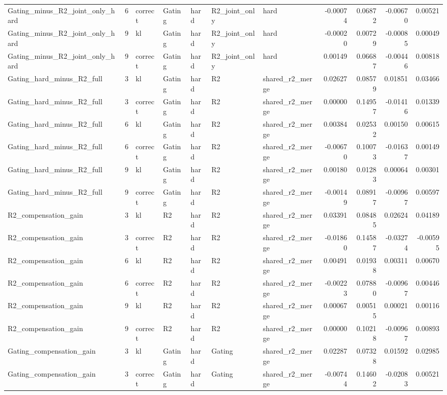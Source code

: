 \begin{tabular}{lrlllllrrrr}
Gating_minus_R2_joint_only_hard & 6 & correct & Gating & hard & R2_joint_only & hard & -0.00074 & 0.06872 & -0.00670 & 0.00521 \\
Gating_minus_R2_joint_only_hard & 9 & kl & Gating & hard & R2_joint_only & hard & -0.00020 & 0.00729 & -0.00085 & 0.00049 \\
Gating_minus_R2_joint_only_hard & 9 & correct & Gating & hard & R2_joint_only & hard & 0.00149 & 0.06687 & -0.00446 & 0.00818 \\
Gating_hard_minus_R2_full & 3 & kl & Gating & hard & R2 & shared_r2_merge & 0.02627 & 0.08579 & 0.01851 & 0.03466 \\
Gating_hard_minus_R2_full & 3 & correct & Gating & hard & R2 & shared_r2_merge & 0.00000 & 0.14957 & -0.01416 & 0.01339 \\
Gating_hard_minus_R2_full & 6 & kl & Gating & hard & R2 & shared_r2_merge & 0.00384 & 0.02532 & 0.00150 & 0.00615 \\
Gating_hard_minus_R2_full & 6 & correct & Gating & hard & R2 & shared_r2_merge & -0.00670 & 0.10073 & -0.01637 & 0.00149 \\
Gating_hard_minus_R2_full & 9 & kl & Gating & hard & R2 & shared_r2_merge & 0.00180 & 0.01283 & 0.00064 & 0.00301 \\
Gating_hard_minus_R2_full & 9 & correct & Gating & hard & R2 & shared_r2_merge & -0.00149 & 0.08917 & -0.00967 & 0.00597 \\
R2_compensation_gain & 3 & kl & R2 & hard & R2 & shared_r2_merge & 0.03391 & 0.08485 & 0.02624 & 0.04189 \\
R2_compensation_gain & 3 & correct & R2 & hard & R2 & shared_r2_merge & -0.01860 & 0.14587 & -0.03274 & -0.00595 \\
R2_compensation_gain & 6 & kl & R2 & hard & R2 & shared_r2_merge & 0.00491 & 0.01938 & 0.00311 & 0.00670 \\
R2_compensation_gain & 6 & correct & R2 & hard & R2 & shared_r2_merge & -0.00223 & 0.07880 & -0.00967 & 0.00446 \\
R2_compensation_gain & 9 & kl & R2 & hard & R2 & shared_r2_merge & 0.00067 & 0.00515 & 0.00021 & 0.00116 \\
R2_compensation_gain & 9 & correct & R2 & hard & R2 & shared_r2_merge & 0.00000 & 0.10218 & -0.00967 & 0.00893 \\
Gating_compensation_gain & 3 & kl & Gating & hard & Gating & shared_r2_merge & 0.02287 & 0.07328 & 0.01592 & 0.02985 \\
Gating_compensation_gain & 3 & correct & Gating & hard & Gating & shared_r2_merge & -0.00744 & 0.14602 & -0.02083 & 0.00521 \\

\end{tabular}
